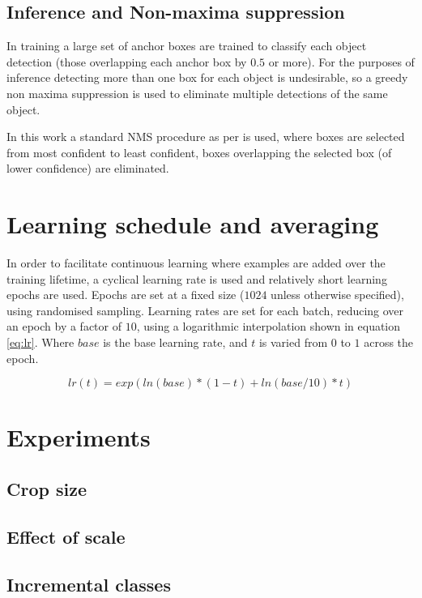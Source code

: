 \subsection{Inference and Non-maxima suppression}

In training a large set of anchor boxes are trained to classify each object detection (those overlapping each anchor box by $0.5$ or more). For the purposes of inference detecting more than one box for each object is undesirable, so a greedy non maxima suppression is used to eliminate multiple detections of the same object.

In this work a standard \gls{NMS} procedure as per \cite{Wang2017} is used, where boxes are selected from most confident to least confident, boxes overlapping the selected box (of lower confidence) are eliminated.


\section {Learning schedule and averaging}
\label{sec:schedule}

In order to facilitate continuous learning where examples are added over the training lifetime, a cyclical learning rate is used and relatively short learning epochs are used. Epochs are set at a fixed size ($1024$ unless otherwise specified), using randomised sampling. Learning rates are set for each batch, reducing over an epoch by a factor of $10$, using a logarithmic interpolation shown in equation \ref{eq:lr}. Where $base$ is the base learning rate, and $t$ is varied from $0$ to $1$ across the epoch.

\begin{equation}
lr(t) = exp(ln (base) * (1 - t) + ln(base/10)  * t)
\label{eq:lr}
\end{equation}




\section {Experiments}
\label{sec:experiments}

\subsection {Crop size}
\label{sec:crop_size}


\subsection {Effect of scale}
\label{sec:detection_architecture}



\subsection {Incremental classes}
\label{sec:incremental}


